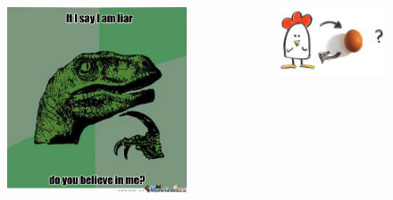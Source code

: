 \documentclass[
	11pt,
	aspectratio=169,
]{beamer}
\begin{document}
\begin{frame}
\begin{columns}
\begin{figure}
        				\includegraphics[width=\textwidth]{resources/liar.jpg}
        			\end{figure}
        			\begin{figure}
        				\includegraphics[width=\textwidth]{resources/chickenegg.jpg}
        			\end{figure}
        	\end{columns}
        \end{frame}
\end{document}
